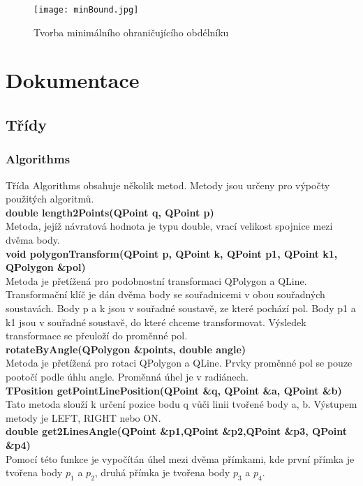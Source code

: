 \documentclass[a4paper, 12pt]{article}
\begin{document}
\begin{figure}[h!]
	\centering
	\texttt{[image: minBound.jpg]}
	\caption{Tvorba minimálního ohraničujícího obdélníku}
\end{figure}

\clearpage

\section{Dokumentace}
\subsection{Třídy}
\subsubsection{Algorithms}
Třída Algorithms obsahuje několik metod. Metody jsou určeny pro výpočty použitých algoritmů.
\\

\textbf{double length2Points(QPoint q, QPoint p)}\\
Metoda, jejíž návratová hodnota je typu double, vrací velikost spojnice mezi dvěma body.
\\

\textbf{void polygonTransform(QPoint p, QPoint k, QPoint p1, QPoint k1, QPolygon \&pol)}\\
Metoda je přetížená pro  podobnostní transformaci QPolygon a QLine. Transformační klíč je dán dvěma body se souřadnicemi v obou souřadných soustavách. Body p a k jsou v souřadné soustavě, ze které pochází pol. Body p1 a k1 jsou v souřadné soustavě, do které chceme transformovat. Výsledek transformace se přeuloží do proměnné pol.
\\

\textbf{rotateByAngle(QPolygon \&points, double angle)}\\
Metoda je přetížená pro rotaci QPolygon a QLine. Prvky proměnné pol se pouze pootočí podle úhlu angle. Proměnná úhel je v radiánech. 
\\

\textbf{TPosition getPointLinePosition(QPoint \&q, QPoint \&a, QPoint \&b)}\\
Tato metoda slouží k určení pozice bodu q vůči linii tvořené body a, b. Výstupem metody je LEFT, RIGHT nebo ON.\\


\textbf{double get2LinesAngle(QPoint \&p1,QPoint \&p2,QPoint \&p3, QPoint \&p4)}\\
Pomocí této funkce je vypočítán úhel mezi dvěma přímkami, kde první přímka je tvořena body $ p_1 $ a $p_2$, druhá přímka je tvořena body $ p_3 $ a $p_4$.\\
\end{document}
